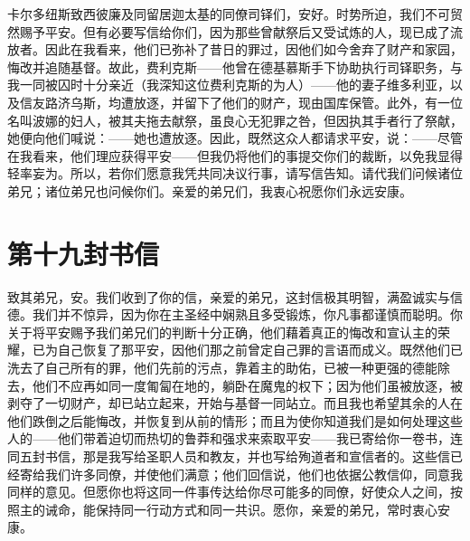 \par

卡尔多纽斯致西彼廉及同留居迦太基的同僚司铎们，安好。时势所迫，我们不可贸然赐予平安。但有必要写信给你们，因为那些曾献祭后又受试炼的人，现已成了流放者。因此在我看来，他们已弥补了昔日的罪过，因他们如今舍弃了财产和家园，悔改并追随基督。故此，费利克斯——他曾在德基慕斯手下协助执行司铎职务，与我一同被囚时十分亲近（我深知这位费利克斯的为人）——他的妻子维多利亚，以及信友路济乌斯，均遭放逐，并留下了他们的财产，现由国库保管。此外，有一位名叫波娜的妇人，被其夫拖去献祭，虽良心无犯罪之咎，但因执其手者行了祭献，她便向他们喊说：——她也遭放逐。因此，既然这众人都请求平安，说：——尽管在我看来，他们理应获得平安——但我仍将他们的事提交你们的裁断，以免我显得轻率妄为。所以，若你们愿意我凭共同决议行事，请写信告知。请代我们问候诸位弟兄；诸位弟兄也问候你们。亲爱的弟兄们，我衷心祝愿你们永远安康。\par



\section{第十九封书信}

\par

\par

致其弟兄，安。我们收到了你的信，亲爱的弟兄，这封信极其明智，满盈诚实与信德。我们并不惊异，因为你在主圣经中娴熟且多受锻炼，你凡事都谨慎而聪明。你关于将平安赐予我们弟兄们的判断十分正确，他们藉着真正的悔改和宣认主的荣耀，已为自己恢复了那平安，因他们那之前曾定自己罪的言语而成义。既然他们已洗去了自己所有的罪，他们先前的污点，靠着主的助佑，已被一种更强的德能除去，他们不应再如同一度匍匐在地的，躺卧在魔鬼的权下；因为他们虽被放逐，被剥夺了一切财产，却已站立起来，开始与基督一同站立。而且我也希望其余的人在他们跌倒之后能悔改，并恢复到从前的情形；而且为使你知道我们是如何处理这些人的——他们带着迫切而热切的鲁莽和强求来索取平安——我已寄给你一卷书，连同五封书信，那是我写给圣职人员和教友，并也写给殉道者和宣信者的。这些信已经寄给我们许多同僚，并使他们满意；他们回信说，他们也依据公教信仰，同意我同样的意见。但愿你也将这同一件事传达给你尽可能多的同僚，好使众人之间，按照主的诫命，能保持同一行动方式和同一共识。愿你，亲爱的弟兄，常时衷心安康。\par

